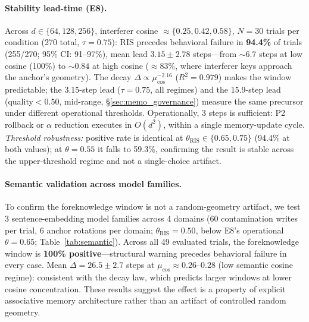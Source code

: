 \documentclass{ceurart}
\begin{document}
\paragraph{Stability lead-time (E8).}
Across $d{\in}\{64,128,256\}$, interferer cosine ${\approx}\{0.25,0.42,0.58\}$,
$N{=}30$ trials per condition (270 total, $\tau{=}0.75$):
RIS precedes behavioral failure in \textbf{94.4\%} of trials
(255/270; 95\% CI: 91--97\%), mean lead $3.15{\pm}2.78$ steps---from
${\sim}6.7$ steps at low cosine (100\%) to ${\sim}0.84$ at high cosine
(${\approx}83\%$, where interferer keys approach the anchor's geometry).
The decay $\Delta \propto \mu_{\cos}^{-2.16}$ ($R^2{=}0.979$) makes the window
predictable; the 3.15-step lead ($\tau{=}0.75$, all regimes) and the 15.9-step
lead (quality${<}0.50$, mid-range, \S\ref{sec:memo_governance}) measure the
same precursor under different operational thresholds.
Operationally, 3 steps is sufficient: P2 rollback or $\alpha$ reduction
executes in $O(d^2)$, within a single memory-update cycle.
\emph{Threshold robustness:} positive rate is identical at
$\theta_{\mathrm{RIS}}{\in}\{0.65,0.75\}$ (94.4\% at both values); at
$\theta{=}0.55$ it falls to 59.3\%, confirming the result is stable across
the upper-threshold regime and not a single-choice artifact.

\paragraph{Semantic validation across model families.}
To confirm the foreknowledge window is not a random-geometry artifact,
we test 3 sentence-embedding model families across 4 domains
(60 contamination writes per trial, 6 anchor rotations per domain;
$\theta_{\mathrm{RIS}}{=}0.50$, below E8's operational $\theta{=}0.65$;
Table~\ref{tab:semantic}).
Across all 49 evaluated trials, the foreknowledge window is \textbf{100\%
positive}---structural warning precedes behavioral failure in every case.
Mean $\Delta{=}26.5{\pm}2.7$ steps at $\mu_{\cos}{\approx}0.26$--$0.28$
(low semantic cosine regime): consistent with the decay law, which predicts
larger windows at lower cosine concentration.
These results suggest the effect is a property of explicit associative memory
architecture rather than an artifact of controlled random geometry.
\end{document}
